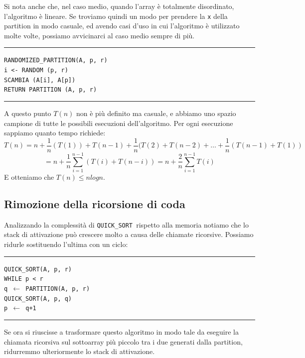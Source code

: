 \documentclass[a4paper,12pt,twoside]{report}
\newcommand\pseudo[1]{\setlength\parindent{0pt}\texttt{#1}\setlength\parindent{24pt} \\}
\newcommand\hlin{\noindent\rule[0.5ex]{\linewidth}{1pt}}
\newcommand\take[2]{#1 $\leftarrow$ #2}
\newcommand\quicksort{\texttt{QUICK\_SORT }}
\begin{document}
Si nota anche che, nel caso medio, quando l'array \`{e} totalmente disordinato, l'algoritmo \`{e} lineare. Se troviamo quindi un modo per prendere la \texttt{x} della partition in modo casuale, ed avendo casi d'uso in cui l'algoritmo \`{e} utilizzato molte volte, possiamo avvicinarci al caso medio sempre di pi\`{u}.

\hlin

\pseudo{RANDOMIZED\_PARTITION(A, p, r)}
\texttt{\indent i <- RANDOM (p, r) \\
\indent SCAMBIA (A[i], A[p]) \\
\indent RETURN PARTITION (A, p, r) 
}

\hlin

A questo punto $T(n)$ non \`{e} pi\`{u} definito ma casuale, e abbiamo uno spazio campione di tutte le possibili esecuzioni dell'algoritmo. Per ogni esecuzione sappiamo quanto tempo richiede:
\[ T(n) = n + \frac{1}{n}(T(1)) + T(n-1) + \frac{1}{n}(T(2) + T(n-2) + \dots + \frac{1}{n}(T(n-1)+ T(1)) \]
\[ = n + \frac{1}{n} \sum_{i=1}^{n-1}(T(i) + T(n-i)) = n + \frac{2}{n}\sum_{i=1}^{n-1} T(i) \]
E otteniamo che $T(n) \le n log n$.

\subsection{Rimozione della ricorsione di coda}

Analizzando la complessit\`{a} di \quicksort rispetto alla memoria notiamo che lo stack di attivazione pu\`{o} crescere molto a causa delle chiamate ricorsive. Possiamo ridurle sostituendo l'ultima con un ciclo:

\hlin

\pseudo{QUICK\_SORT(A, p, r)}
\texttt{\indent WHILE p < r \\
\indent\indent \take{q}{PARTITION(A, p, r)} \\
\indent\indent QUICK\_SORT(A, p, q) \\
\indent\indent \take{p}{q+1} \\
}

\hlin

Se ora si riuscisse a trasformare questo algoritmo in modo tale da eseguire la chiamata ricorsiva sul sottoarray pi\`{u} piccolo tra i due generati dalla partition, ridurremmo ulteriormente lo stack di attivazione.
\end{document}
